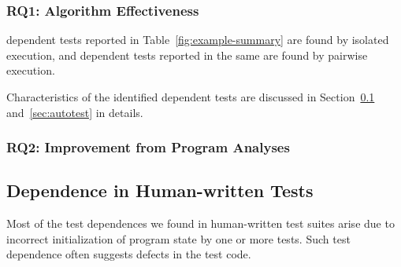 
\subsubsection{RQ1: Algorithm Effectiveness}

 dependent tests reported in Table~\ref{fig:example-summary}
are found by isolated execution, and  dependent
tests reported in the same are found by pairwise execution.

 

Characteristics of the identified dependent tests are discussed
in Section~\ref{sec:humantest} and~\ref{sec:autotest} in details.


\subsubsection{RQ2: Improvement from Program Analyses}


\subsection{Dependence in Human-written Tests}
\label{sec:humantest}


Most of the test dependences we found in human-written
test suites arise due to incorrect initialization
of program state by one or more tests. Such test
dependence often suggests defects in the
test code. 



